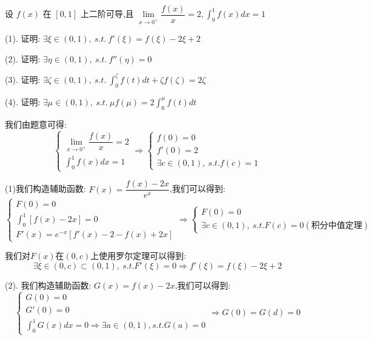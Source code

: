 \begin{example}[][Exam: 35.4.18]
	设 $f(x)$ 在 $[0,1]$ 上二阶可导,且 $\lim\limits_{x\to 0^{+}}\dfrac{f(x)}{x}=2, \int_{0}^{1}f(x)dx=1$

(1). 证明: $\exists \xi\in(0,1),\ s.t.\ f'(\xi)=f(\xi)-2\xi+2$

(2). 证明: $\exists \eta\in(0,1),\ s.t.\ f''(\eta)=0$

(3). 证明: $\exists \zeta\in(0,1),\ s.t.\ \int_{0}^{\zeta}f(t)dt+\zeta f(\zeta)=2\zeta$

(4). 证明: $\exists \mu\in(0,1),\ s.t.\ \mu f(\mu)=2\int_{0}^{\mu}f(t)dt$
\end{example}
\begin{solution}

	我们由题意可得:  
	$$\left\lbrace
	\begin{array}{l}
		\lim\limits_{x\to 0^{+}}\dfrac{f(x)}{x}=2\\
		\int_{0}^{1}f(x)dx=1
	\end{array}
	\right. \Rightarrow \left\lbrace
	\begin{array}{l}
		f(0)=0\\
		f'(0)=2\\
		\exists c\in(0,1),\ s.t. f(c)=1
	\end{array}
	\right. $$
	
	(1)我们构造辅助函数:  $F(x)=\dfrac{f(x)-2x}{e^x}$,我们可以得到:  
	$$\left\lbrace
	\begin{array}{l}
		F(0)=0\\
		\int_{0}^{1}[f(x)-2x]=0\\
		F'(x)=e^{-x}[f'(x)-2-f(x)+2x]
	\end{array}
	\right. \Rightarrow \left\lbrace
	\begin{array}{l}
		F(0)=0\\
		\exists c\in(0,1),\ s.t. F(c)=0(\text{积分中值定理})
	\end{array}
	\right. $$
	
	我们对$F(x)$在$(0,c)$上使用罗尔定理可以得到:  
	$$\exists \xi\in(0,c)\subset(0,1),\ s.t. F'(\xi)=0\Rightarrow f'(\xi)=f(\xi)-2\xi+2$$
	
	(2). 我们构造辅助函数:  $G(x)=f(x)-2x$,我们可以得到:  
	$$\left\lbrace
	\begin{array}{l}
		G(0)=0\\
		G'(0)=0\\
		\int_{0}^{1}G(x)dx=0\Rightarrow \exists a\in(0,1),s.t. G(a)=0
	\end{array}
	\right. \Rightarrow G(0)=G(d)=0$$
	

\end{solution}
